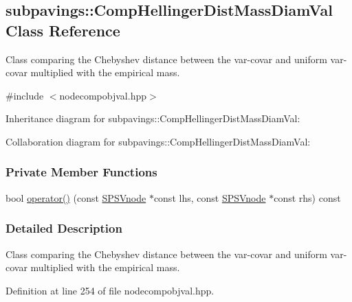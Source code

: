 \hypertarget{classsubpavings_1_1CompHellingerDistMassDiamVal}{\subsection{subpavings\-:\-:\-Comp\-Hellinger\-Dist\-Mass\-Diam\-Val \-Class \-Reference}
\label{classsubpavings_1_1CompHellingerDistMassDiamVal}
}


\-Class comparing the \-Chebyshev distance between the var-\/covar and uniform var-\/covar multiplied with the empirical mass.  




{\ttfamily \#include $<$nodecompobjval.\-hpp$>$}



\-Inheritance diagram for subpavings\-:\-:\-Comp\-Hellinger\-Dist\-Mass\-Diam\-Val\-:


\-Collaboration diagram for subpavings\-:\-:\-Comp\-Hellinger\-Dist\-Mass\-Diam\-Val\-:
\subsubsection*{\-Private \-Member \-Functions}
\begin{DoxyCompactItemize}
\item 
bool \hyperlink{classsubpavings_1_1CompHellingerDistMassDiamVal_a8f43d4b0906ee0b20501cfea6cc79724}{operator()} (const \hyperlink{classsubpavings_1_1SPSVnode}{\-S\-P\-S\-Vnode} $\ast$const lhs, const \hyperlink{classsubpavings_1_1SPSVnode}{\-S\-P\-S\-Vnode} $\ast$const rhs) const 
\end{DoxyCompactItemize}


\subsubsection{\-Detailed \-Description}
\-Class comparing the \-Chebyshev distance between the var-\/covar and uniform var-\/covar multiplied with the empirical mass. 

\-Definition at line 254 of file nodecompobjval.\-hpp.



